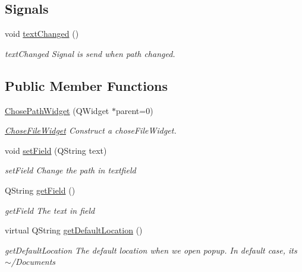 \subsection*{Signals}
\begin{DoxyCompactItemize}
\item 
\hypertarget{classGui_1_1Widgets_1_1Path_1_1ChosePathWidget_aab68756973032c2130967efdcc5f2973}{}void \hyperlink{classGui_1_1Widgets_1_1Path_1_1ChosePathWidget_aab68756973032c2130967efdcc5f2973}{text\+Changed} ()\label{classGui_1_1Widgets_1_1Path_1_1ChosePathWidget_aab68756973032c2130967efdcc5f2973}

\begin{DoxyCompactList}\small\item\em text\+Changed Signal is send when path changed. \end{DoxyCompactList}\end{DoxyCompactItemize}
\subsection*{Public Member Functions}
\begin{DoxyCompactItemize}
\item 
\hyperlink{classGui_1_1Widgets_1_1Path_1_1ChosePathWidget_a978d2251c213ff092767e83912924649}{Chose\+Path\+Widget} (Q\+Widget $\ast$parent=0)
\begin{DoxyCompactList}\small\item\em \hyperlink{classGui_1_1Widgets_1_1Path_1_1ChoseFileWidget}{Chose\+File\+Widget} Construct a chose\+File\+Widget. \end{DoxyCompactList}\item 
void \hyperlink{classGui_1_1Widgets_1_1Path_1_1ChosePathWidget_adc6f1687854a9ace6fa82a3200b49f84}{set\+Field} (Q\+String text)
\begin{DoxyCompactList}\small\item\em set\+Field Change the path in textfield \end{DoxyCompactList}\item 
Q\+String \hyperlink{classGui_1_1Widgets_1_1Path_1_1ChosePathWidget_ab36def0231e202c317914e19e023b244}{get\+Field} ()
\begin{DoxyCompactList}\small\item\em get\+Field The text in field \end{DoxyCompactList}\item 
virtual Q\+String \hyperlink{classGui_1_1Widgets_1_1Path_1_1ChosePathWidget_aa597dbc1297f0e85605a1859b64a799e}{get\+Default\+Location} ()
\begin{DoxyCompactList}\small\item\em get\+Default\+Location The default location when we open popup. In default case, it\textquotesingle{}s $\sim$/\+Documents \end{DoxyCompactList}\end{DoxyCompactItemize}
